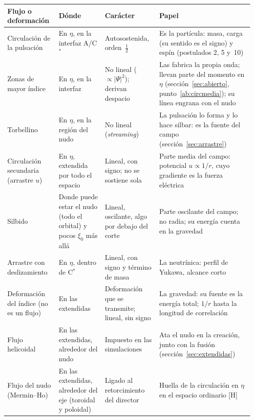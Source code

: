 \documentclass[11pt,a4paper]{article}
\newcommand{\st}[1]{\textup{[#1]}}
\newcommand{\Cst}{C\ensuremath{^{*}}}
\begin{document}
\begin{center}
\small
\begin{tabularx}{\textwidth}{@{}>{\raggedright\arraybackslash}p{} >{\raggedright\arraybackslash}p{} >{\raggedright\arraybackslash}p{} Y@{}}
\toprule
Flujo o deformación & Dónde & Carácter & Papel \\
\midrule
Circulación de la pulsación & En $\eta$, en la interfaz A/\Cst & Autosostenida, orden~$\tfrac12$ & Es la partícula: masa, carga (su sentido es el signo) y espín (postulados 2, 5 y~10) \\
\addlinespace
Zonas de mayor índice & En $\eta$, en la interfaz & No lineal ($\propto|\Psi|^2$); derivan despacio & Las fabrica la propia onda; llevan parte del momento en $\eta$ (sección~\ref{sec:abierto}, punto~\ref{ab:circmedia}); su línea engrana con el nudo \\
\addlinespace
Torbellino & En $\eta$, en la región del nudo & No lineal (\emph{streaming}) & La pulsación lo forma y lo hace silbar: es la fuente del campo (sección~\ref{sec:arrastre}) \\
\addlinespace
Circulación secundaria (arrastre $u$) & En $\eta$, extendida por todo el espacio & Lineal, con signo; no se sostiene sola & Parte media del campo: potencial $u\propto1/r$, cuyo gradiente es la fuerza eléctrica \\
\addlinespace
Silbido & Donde puede estar el nudo (todo el orbital) y pocos $\xi_0$ más allá & Lineal, oscilante, algo por debajo del corte & Parte oscilante del campo; no radia; su energía cuenta en la gravedad \\
\addlinespace
Arrastre con deslizamiento & En $\eta$, dentro de \Cst & Lineal, con signo y término de masa & La neutrínica: perfil de Yukawa, alcance corto \\
\addlinespace
Deformación del índice (no es un flujo) & En las extendidas & Deformación que se transmite; lineal, sin signo & La gravedad: su fuente es la energía total; $1/r$ hasta la longitud de correlación \\
\addlinespace
Flujo helicoidal & En las extendidas, alrededor del nudo & Impuesto en las simulaciones & Ata el nudo en la creación, junto con la fusión (sección~\ref{sec:extendidas}) \\
\addlinespace
Flujo del nudo (Mermin--Ho) & En las extendidas, alrededor del eje (toroidal y poloidal) & Ligado al retorcimiento del director & Huella de la circulación en $\eta$ en el espacio ordinario \st{H} \\
\bottomrule
\end{tabularx}
\end{center}
\end{document}
